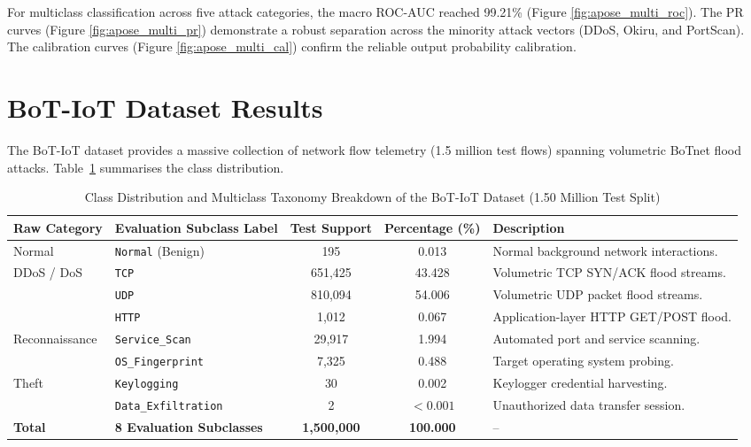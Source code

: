 \documentclass[a4paper,fleqn]{cas-sc}
\begin{document}
For multiclass classification across five attack categories, the macro ROC-AUC reached 99.21\% (Figure \ref{fig:apose_multi_roc}). The PR curves (Figure \ref{fig:apose_multi_pr}) demonstrate a robust separation across the minority attack vectors (DDoS, Okiru, and PortScan). The calibration curves (Figure \ref{fig:apose_multi_cal}) confirm the reliable output probability calibration.

\section{BoT-IoT Dataset Results}
\label{sec:supp_bot_results}

The BoT-IoT dataset provides a massive collection of network flow telemetry (1.5 million test flows) spanning volumetric BoTnet flood attacks. Table~\ref{tab:bot_dataset_summary} summarises the class distribution.

\begin{table}[h!]
\centering
\caption{Class Distribution and Multiclass Taxonomy Breakdown of the BoT-IoT Dataset (1.50 Million Test Split)}
\label{tab:bot_dataset_summary}
\begin{tabular}{llcc p{5.5cm}}
\toprule
\textbf{Raw Category} & \textbf{Evaluation Subclass Label} & \textbf{Test Support} & \textbf{Percentage (\%)} & \textbf{Description} \\
\midrule
Normal & \texttt{Normal} (Benign) & 195 & 0.013 & Normal background network interactions. \\
\midrule
\multirow{3}{*}{DDoS / DoS} & \texttt{TCP} & 651,425 & 43.428 & Volumetric TCP SYN/ACK flood streams. \\
 & \texttt{UDP} & 810,094 & 54.006 & Volumetric UDP packet flood streams. \\
 & \texttt{HTTP} & 1,012 & 0.067 & Application-layer HTTP GET/POST flood. \\
\midrule
\multirow{2}{*}{Reconnaissance} & \texttt{Service\_Scan} & 29,917 & 1.994 & Automated port and service scanning. \\
 & \texttt{OS\_Fingerprint} & 7,325 & 0.488 & Target operating system probing. \\
\midrule
\multirow{2}{*}{Theft} & \texttt{Keylogging} & 30 & 0.002 & Keylogger credential harvesting. \\
 & \texttt{Data\_Exfiltration} & 2 & $<0.001$ & Unauthorized data transfer session. \\
\midrule
\textbf{Total} & \textbf{8 Evaluation Subclasses} & \textbf{1,500,000} & \textbf{100.000} & -- \\
\bottomrule
\end{tabular}
\end{table}
\end{document}
